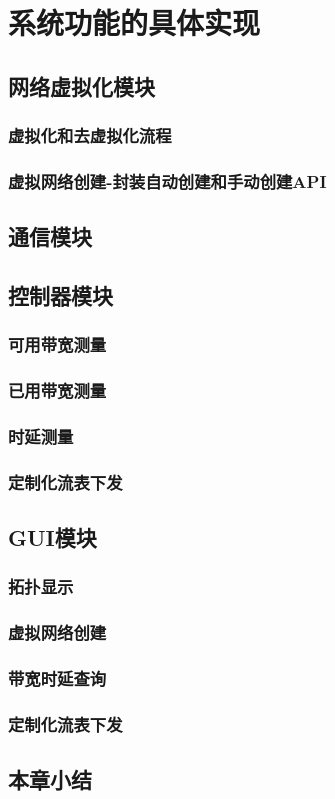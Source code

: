 \chapter{系统功能的具体实现}
\section{网络虚拟化模块}
\subsection{虚拟化和去虚拟化流程}
\subsection{虚拟网络创建-封装自动创建和手动创建API}
\section{通信模块}
\section{控制器模块}
\subsection{可用带宽测量}
\subsection{已用带宽测量}
\subsection{时延测量}
\subsection{定制化流表下发}
\section{GUI模块}
\subsection{拓扑显示}
\subsection{虚拟网络创建}
\subsection{带宽时延查询}
\subsection{定制化流表下发}
\section{本章小结}